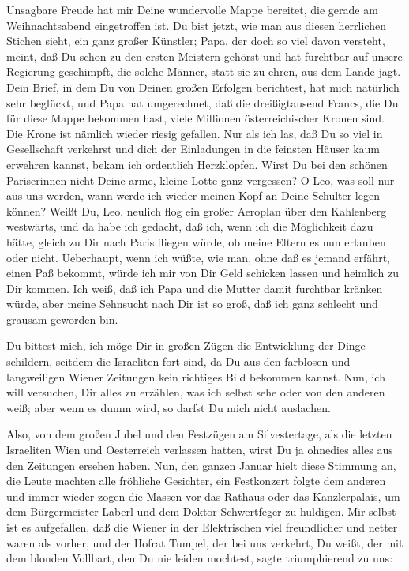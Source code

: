 Unsagbare Freude hat mir Deine wundervolle Mappe bereitet, die
gerade am Weihnachtsabend eingetroffen ist. Du bist jetzt, wie man
aus diesen herrlichen Stichen sieht, ein ganz großer Künstler;
Papa, der doch so viel davon versteht, meint, daß Du schon zu den
ersten Meistern gehörst und hat furchtbar auf unsere Regierung
geschimpft, die solche Männer, statt sie zu ehren, aus dem Lande
jagt.  Dein Brief, in dem Du von Deinen großen
Erfolgen berichtest, hat mich natürlich sehr beglückt, und Papa hat
umgerechnet, daß die dreißigtausend Francs, die Du für diese Mappe
bekommen hast, viele Millionen österreichischer Kronen sind. Die
Krone ist nämlich wieder riesig gefallen. Nur als ich las, daß Du
so viel in Gesellschaft verkehrst und dich der Einladungen in die
feinsten Häuser kaum erwehren kannst, bekam ich ordentlich
Herzklopfen. Wirst Du bei den schönen Pariserinnen nicht Deine
arme, kleine Lotte ganz vergessen? O Leo, was soll nur aus uns
werden, wann werde ich wieder meinen Kopf an Deine Schulter legen
können? Weißt Du, Leo, neulich flog ein großer Aeroplan über den
Kahlenberg westwärts, und da habe ich gedacht, daß ich, wenn ich
die Möglichkeit dazu hätte, gleich zu Dir nach Paris fliegen würde,
ob meine Eltern es nun erlauben oder nicht. Ueberhaupt, wenn ich
wüßte, wie man, ohne daß es jemand erfährt, einen Paß bekommt,
würde ich mir von Dir Geld schicken lassen und heimlich zu Dir
kommen. Ich weiß, daß ich Papa und die Mutter damit furchtbar
kränken würde, aber meine Sehnsucht nach Dir ist so groß, daß ich
ganz schlecht und grausam geworden bin.

Du bittest mich, ich möge Dir in großen Zügen die Entwicklung der
Dinge schildern, seitdem die Israeliten fort sind, da Du aus den
farblosen und langweiligen Wiener Zeitungen kein richtiges Bild
bekommen kannst. Nun, ich will versuchen, Dir alles zu erzählen,
was ich selbst sehe oder von den anderen weiß; aber wenn es dumm
wird, so darfst Du mich nicht auslachen.

Also, von dem großen Jubel und den Festzügen am
Silvestertage, als die letzten Israeliten Wien und Oesterreich
verlassen hatten, wirst Du ja ohnedies alles aus den Zeitungen
ersehen haben. Nun, den ganzen Januar hielt diese Stimmung an, die
Leute machten alle fröhliche Gesichter, ein Festkonzert folgte dem
anderen und immer wieder zogen die Massen vor das Rathaus oder das
Kanzlerpalais, um dem Bürgermeister Laberl und dem Doktor
Schwertfeger zu huldigen. Mir selbst ist es aufgefallen, daß die
Wiener in der Elektrischen viel freundlicher und netter waren als
vorher, und der Hofrat Tumpel, der bei uns verkehrt, Du weißt, der
mit dem blonden Vollbart, den Du nie leiden mochtest, sagte
triumphierend zu uns:

